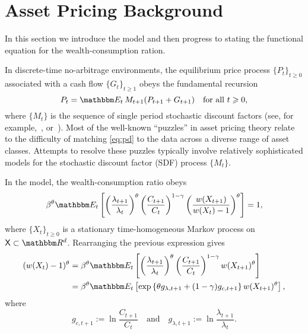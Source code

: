 \documentclass[12pt, reqno]{amsart}
\renewcommand{\geq}{\geqslant}
\newcommand{\1}{\mathbbm 1}
\newcommand{\RR}{\mathbbm R}
\newcommand{\EE}{\mathbbm E}
\newcommand{\XX}{\mathsf X}
\theoremstyle{plain}
\theoremstyle{definition}
\begin{document}
\section{Asset Pricing Background}

In this section we introduce the model and then progress to stating the
functional equation for the wealth-consumption ration.

In discrete-time no-arbitrage environments, the equilibrium price process
$\{P_t\}_{t \geq 0}$ associated with a cash flow $\{G_t\}_{t \geq 1}$ obeys
the fundamental recursion
%
\begin{equation}
    \label{eq:pd}
    P_t
    = \EE_t \, M_{t+1} ( P_{t+1} + G_{t+1} )
    \quad \text{for all } t \geq 0,
\end{equation}
%
where $\{ M_t\}$ is the sequence of single period stochastic discount factors
(see, for example,~\cite{kreps1981arbitrage}, \cite{hansen_richard:1987}
or~\cite{duffie2001dynamic}).  Most of the well-known ``puzzles'' in asset
pricing theory relate to the difficulty of matching \eqref{eq:pd} to the data
across a diverse range of asset classes. Attempts to resolve these puzzles
typically involve relatively sophisticated models for the stochastic discount
factor (SDF) process $\{ M_t\}$.

In the model, the wealth-consumption ratio obeys
%
\begin{equation*}
    \beta^{\theta}
    \EE_t
    \left[
    \left( \frac{\lambda_{t+1}}{\lambda_t} \right)^\theta
        \left( \frac{C_{t+1}}{C_t} \right)^{1-\gamma}
        \left( \frac{w(X_{t+1})}{w(X_t)-1} \right)^\theta
    \right] = 1,
\end{equation*}
%
where $\{ X_t \}_{t \geq 0}$ is a stationary time-homogeneous Markov process on
$\XX \subset \RR^d$.
Rearranging the previous expression gives
%
\begin{align*}
    (w(X_t)-1)^\theta
    & = \beta^{\theta}
    \EE_t
    \left[
    \left( \frac{\lambda_{t+1}}{\lambda_t} \right)^\theta
        \left( \frac{C_{t+1}}{C_t} \right)^{1-\gamma}
        w(X_{t+1})^\theta
    \right]
    \\
    & = \beta^{\theta}
    \EE_t
    \left[
        \exp
        \left\{ 
            \theta g_{\lambda, t+1} + (1-\gamma) g_{c, t+1}
        \right\}
        w(X_{t+1})^\theta
    \right],
\end{align*}
%
where
%
\begin{equation}
    \label{eq:kappa}
    g_{c, t+1}
    := \ln \frac{C_{t+1}}{C_t}
    \quad \text{and} \quad
    g_{\lambda, t+1}
    := \ln \frac{\lambda_{t+1}}{\lambda_t}.
\end{equation}
%
\end{document}
